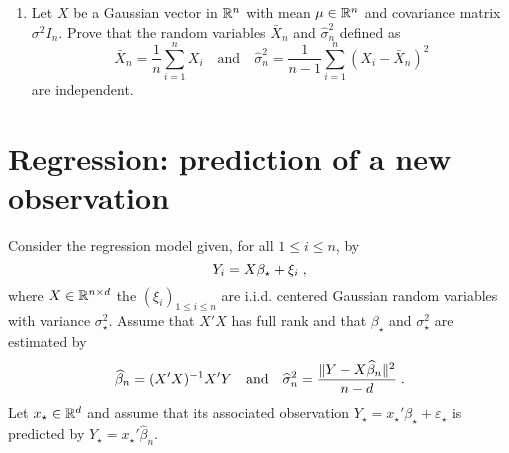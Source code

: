 \begin{enumerate}
\vspace{.2cm}

{\em

}

\item Let $X$ be a Gaussian vector in $\mathbb{R}^n$ with mean $\mu\in\mathbb{R}^n$ and covariance matrix $\sigma^2 I_n$. Prove that the random variables $\bar X_n$ and $\widehat \sigma^2_n$ defined as
\[
\bar X_n = \frac{1}{n}\sum_{i=1}^n X_i\quad \mathrm{and} \quad \widehat \sigma^2_n = \frac{1}{n-1}\sum_{i=1}^n (X_i - \bar X_n)^2
\]
are independent.

\vspace{.2cm}

{\em

}
\end{enumerate}


\section{Regression: prediction of a new observation}
Consider the regression model given, for all $1\leqslant i\leqslant n$, by
\[
Y_{i} = X\beta_{\star}+ \xi_{i}\;,
\]
where $X\in\mathbb{R}^{n\times d}$ the $(\xi_{i})_{1\leqslant i \leqslant n}$ are i.i.d. centered Gaussian random variables with variance $\sigma_{\star}^2$. Assume that $X'X$ has full rank and that $\beta_\star$ and $\sigma_{\star}^2$ are estimated by 
\[
\widehat \beta_n = (X'X)^{-1}X'Y\quad\mathrm{and}\quad \widehat \sigma^2_n =\frac{\|Y - X\widehat \beta_n \|^2}{n-d}\;.
\]
Let $x_\star \in\mathbb{R}^d$ and assume that its associated observation $Y_\star = x_\star'\beta_\star + \varepsilon_\star$ is predicted by $\widehat Y_\star = x_\star'\widehat \beta_n$.
